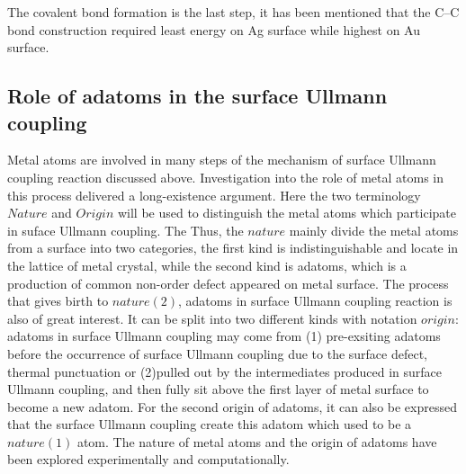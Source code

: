 \documentclass[%
 reprint,
 amsmath,amssymb,
 aps,
prb,
]{revtex4-2}
\begin{document}
The covalent bond formation is the last step, it has been mentioned that the C--C bond construction required least energy on Ag surface while highest on Au surface.  

\subsection{Role of adatoms in the surface Ullmann coupling} 

Metal atoms are involved in many steps of the mechanism of surface Ullmann coupling reaction discussed above. Investigation into the role of metal atoms in this process delivered a long-existence argument.
Here the two terminology $Nature$ and $Origin$ will be used to distinguish the metal atoms which participate in suface Ullmann coupling.
The %
Thus, the $nature$ mainly divide the metal atoms from a surface into two categories, the first kind is indistinguishable and locate in the lattice of metal crystal, while the second kind is adatoms, which is a production of common non-order defect appeared on metal surface. 
The process that gives birth to $nature(2)$, adatoms in surface Ullmann coupling reaction is also of great interest. It can be split into two different kinds with notation $origin$: adatoms in surface Ullmann coupling may come from (1) pre-exsiting adatoms before the occurrence of surface Ullmann coupling due to the surface defect, thermal punctuation or (2)pulled out by the intermediates produced in surface Ullmann coupling, and then fully sit above the first layer of metal surface to become a new adatom. For the second origin of adatoms, it can also be expressed that the surface Ullmann coupling create this adatom which used to be a $nature(1)$ atom. The nature of metal atoms and the origin of adatoms have been explored experimentally and computationally.
\end{document}

